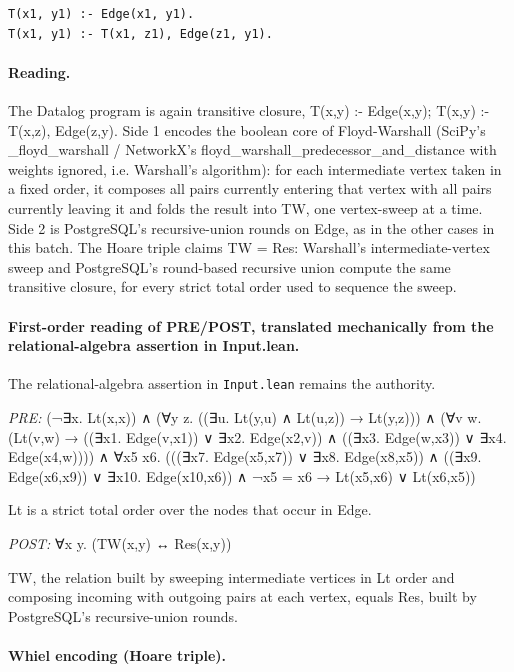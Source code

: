 \documentclass[10pt]{article}
\begin{document}
\begin{Verbatim}[fontsize=\scriptsize,breaklines=true,breakanywhere=true,frame=single,framesep=1.5mm]
T(x1, y1) :- Edge(x1, y1).
T(x1, y1) :- T(x1, z1), Edge(z1, y1).
\end{Verbatim}

\paragraph{Reading.} The Datalog program is again transitive closure, T(x,y) :- Edge(x,y); T(x,y) :- T(x,z), Edge(z,y). Side 1 encodes the boolean core of Floyd-Warshall (SciPy's \_floyd\_warshall / NetworkX's floyd\_warshall\_predecessor\_and\_distance with weights ignored, i.e. Warshall's algorithm): for each intermediate vertex taken in a fixed order, it composes all pairs currently entering that vertex with all pairs currently leaving it and folds the result into TW, one vertex-sweep at a time. Side 2 is PostgreSQL's recursive-union rounds on Edge, as in the other cases in this batch. The Hoare triple claims TW = Res: Warshall's intermediate-vertex sweep and PostgreSQL's round-based recursive union compute the same transitive closure, for every strict total order used to sequence the sweep.

\paragraph{First-order reading of PRE/POST, translated mechanically from the relational-algebra assertion in Input.lean.} The relational-algebra assertion in \texttt{Input.lean} remains the authority.

\textit{PRE:} (¬∃x. Lt(x,x)) ∧ (∀y z. ((∃u. Lt(y,u) ∧ Lt(u,z)) → Lt(y,z))) ∧ (∀v w. (Lt(v,w) → ((∃x1. Edge(v,x1)) ∨ ∃x2. Edge(x2,v)) ∧ ((∃x3. Edge(w,x3)) ∨ ∃x4. Edge(x4,w)))) ∧ ∀x5 x6. (((∃x7. Edge(x5,x7)) ∨ ∃x8. Edge(x8,x5)) ∧ ((∃x9. Edge(x6,x9)) ∨ ∃x10. Edge(x10,x6)) ∧ ¬x5 = x6 → Lt(x5,x6) ∨ Lt(x6,x5))\par Lt is a strict total order over the nodes that occur in Edge.

\textit{POST:} ∀x y. (TW(x,y) ↔ Res(x,y))\par TW, the relation built by sweeping intermediate vertices in Lt order and composing incoming with outgoing pairs at each vertex, equals Res, built by PostgreSQL's recursive-union rounds.

\paragraph{Whiel encoding (Hoare triple).}
\end{document}
